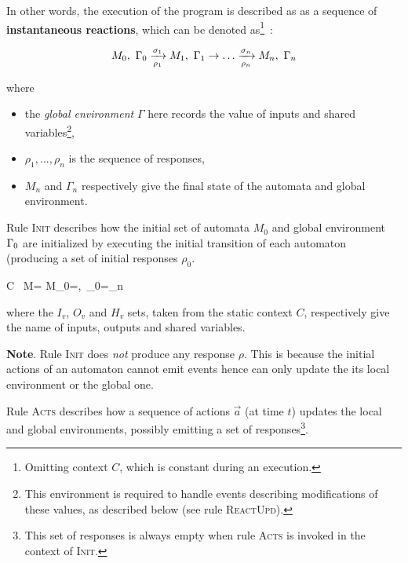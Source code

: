 In other words, the execution of the program is described as as a sequence of \textbf{instantaneous
reactions}, which can be denoted as\footnote{Omitting context $C$, which is constant during an
execution.}~:

\begin{eqnarray*}
  M_0,\ \Gamma_0 \xrightarrow[\rho_1]{\sigma_1} M_1,\ \Gamma_1 \rightarrow \ldots
  \xrightarrow[\rho_n]{\sigma_n} M_n,\ \Gamma_n
\end{eqnarray*}

\noindent where
\begin{itemize}
\item the \emph{global environment} $\Gamma$ here records the value of inputs and shared
  variables\footnote{This environment is required to handle events describing modifications of these
    values, as described below (see rule \textsc{ReactUpd}).},
\item $\rho_1, \ldots, \rho_n$ is the sequence of responses,
  \item $M_n$ and $\Gamma_n$ respectively give the final state of the automata and global
    environment.
\end{itemize}
  
\medskip \step
Rule \textsc{Init} describes how the initial set of automata $M_0$ and global environment
$\Gamma_0$ are initialized by executing the initial transition of each automaton (producing a set of
initial responses $\rho_0$. 

{C \vdash\ M=\setn{\mu} \xrightarrow{} M_0=,\ \env_0=\gamma_n}


\noindent
where the $I_v$, $O_v$ and $H_v$ sets, taken from the static context $C$, respectively give the name of
  inputs, outputs and shared variables.

\medskip
\textbf{Note}. Rule \textsc{Init} does \emph{not} produce any response
$\rho$. This is because the initial actions of an automaton cannot emit events hence can only update the
its local environment or the global one.

\medskip \step Rule \textsc{Acts} describes how a sequence of actions $\vec{a}$ (at time
$t$) updates the local and global environments, possibly emitting a set of responses\footnote{This
  set of responses is always empty when rule \textsc{Acts} is invoked in the context of \textsc{Init}.}.

